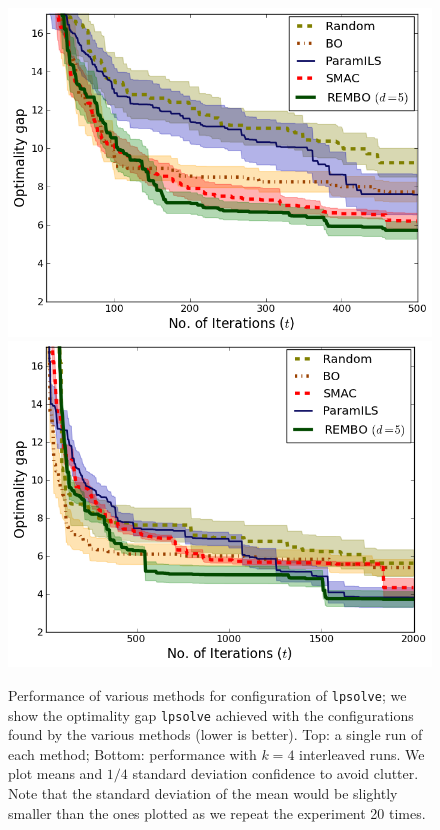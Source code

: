 \documentclass{article}
\begin{document}
\begin{figure}[h!]
\begin{center}
  \includegraphics[scale=0.35]{figures/lpsolve.png}\\
  \includegraphics[scale=0.35]{figures/lpsolve_interleave.png}
  \caption{Performance of various methods for configuration of \texttt{lpsolve}; we show the optimality gap \texttt{lpsolve} achieved with the configurations found by the various methods (lower is better). Top: a single run of each method; Bottom: performance with $k=4$ interleaved runs. We plot means and $1/4$ standard deviation confidence to avoid clutter. Note that the standard deviation of the mean would be slightly smaller
  than the ones plotted as we repeat the experiment 20 times.}
  \label{fig:lpsolve}
\end{center}
\vspace*{-3mm}
 
\end{figure}
\end{document}
